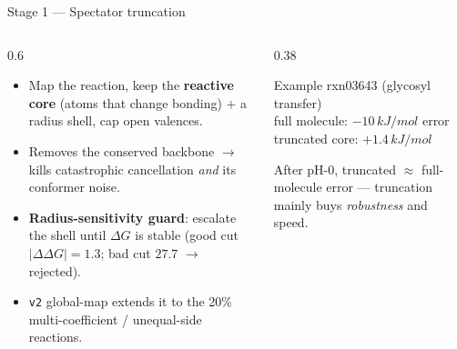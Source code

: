\documentclass[aspectratio=169,11pt]{beamer}
\newcommand{\kj}{\,kJ/mol}
\newcommand{\arw}{$\rightarrow$}
\begin{document}
\begin{frame}{Stage 1 — Spectator truncation}
  \begin{columns}[T]
    \begin{column}{0.6\textwidth}
    \begin{itemize}
      \item Map the reaction, keep the \textbf{reactive core} (atoms that change bonding) $+$ a radius shell, cap open valences.
      \item Removes the conserved backbone \arw{} kills catastrophic cancellation \emph{and} its conformer noise.
      \item \textbf{Radius-sensitivity guard}: escalate the shell until $\Delta G$ is stable
      (good cut $|\Delta\Delta G|{=}1.3$; bad cut $27.7$ \arw{} rejected).
      \item \texttt{v2} global-map extends it to the 20\% multi-coefficient / unequal-side reactions.
    \end{itemize}
    \end{column}
    \begin{column}{0.38\textwidth}
      \begin{block}{Example}
        rxn03643 (glycosyl transfer)\\[0.3em]
        full molecule: $-10\kj$ error\\
        truncated core: \textbf{$+1.4\kj$}
      \end{block}
      {\scriptsize After pH-0, truncated $\approx$ full-molecule error — truncation mainly buys \emph{robustness} and speed.}
    \end{column}
  \end{columns}
\end{frame}
\end{document}
